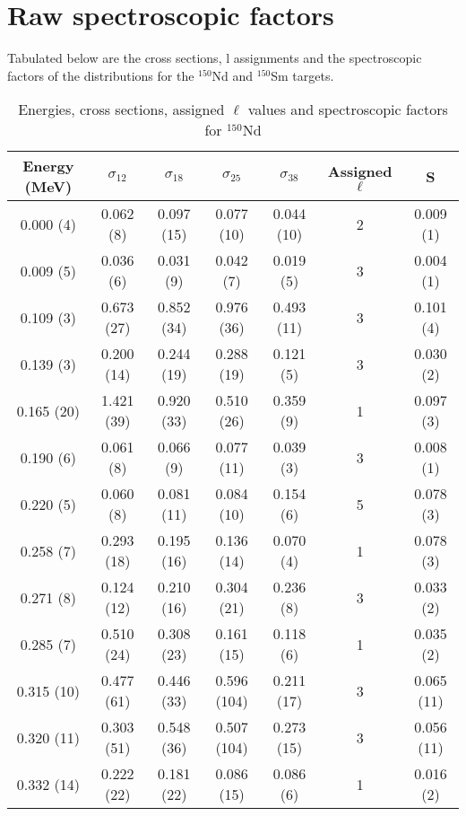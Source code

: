 
\chapter{Raw spectroscopic factors} %

\label{AppendixA} %


Tabulated below are the cross sections, l assignments and the spectroscopic factors of the distributions for the $^{150}$Nd and $^{150}$Sm targets.

\begin{table}
\caption{Energies, cross sections, assigned $\ell$ values and spectroscopic factors for $^{150}$Nd}
\begin{tabular}{c c c c c c c}
\hline \hline
Energy (MeV) & $\sigma_{12}$ & $\sigma_{18}$ & $\sigma_{25}$ & $\sigma_{38}$ & Assigned $\ell$ & S\\
\hline \hline
0.000 (4) & 0.062 (8) & 0.097 (15) & 0.077 (10) & 0.044 (10) & 2 & 0.009 (1) \\
0.009 (5) & 0.036 (6) & 0.031 (9) & 0.042 (7) & 0.019 (5) & 3 & 0.004 (1) \\
0.109 (3) & 0.673 (27) & 0.852 (34) & 0.976 (36) & 0.493 (11) & 3 & 0.101 (4) \\
0.139 (3) & 0.200 (14) & 0.244 (19) & 0.288 (19) & 0.121 (5) & 3 & 0.030 (2) \\
0.165 (20) & 1.421 (39) & 0.920 (33) & 0.510 (26) & 0.359 (9) & 1 & 0.097 (3) \\
0.190 (6) & 0.061 (8) & 0.066 (9) & 0.077 (11) & 0.039 (3) & 3 & 0.008 (1) \\
0.220 (5) & 0.060 (8) & 0.081 (11) & 0.084 (10) & 0.154 (6) & 5 & 0.078 (3) \\
0.258 (7) & 0.293 (18) & 0.195 (16) & 0.136 (14) & 0.070 (4) & 1 & 0.078 (3) \\
0.271 (8) & 0.124 (12) & 0.210 (16) & 0.304 (21) & 0.236 (8) & 3 & 0.033 (2) \\
0.285 (7) & 0.510 (24) & 0.308 (23) & 0.161 (15) & 0.118 (6) & 1 & 0.035 (2) \\
0.315 (10) & 0.477 (61) & 0.446 (33) & 0.596 (104) & 0.211 (17) & 3 & 0.065 (11) \\
0.320 (11) & 0.303 (51) & 0.548 (36) & 0.507 (104) & 0.273 (15) & 3 & 0.056 (11) \\
0.332 (14) & 0.222 (22) & 0.181 (22) & 0.086 (15) & 0.086 (6) & 1 & 0.016 (2) \\

\end{tabular}
\end{table}
